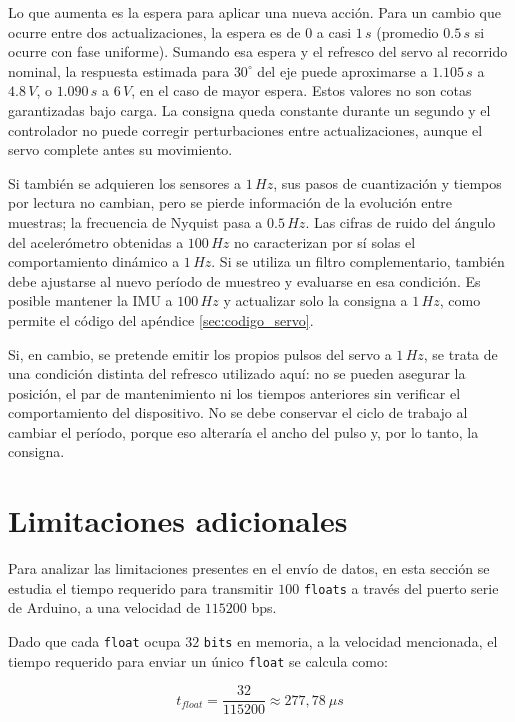 \documentclass[a4paper, twoside, 10pt, spanish]{article}
\numberwithin{table}{section}
\begin{document}
Lo que aumenta es la espera para aplicar una nueva acción. Para un cambio
que ocurre entre dos actualizaciones, la espera es de $0$ a casi $1\,s$
(promedio $0.5\,s$ si ocurre con fase uniforme). Sumando esa espera y el
refresco del servo al recorrido nominal, la respuesta estimada para
$30^\circ$ del eje puede aproximarse a $1.105\,s$ a $4.8\,V$, o
$1.090\,s$ a $6\,V$, en el caso de mayor espera. Estos valores no son
cotas garantizadas bajo carga. La consigna queda constante durante un
segundo y el controlador no puede corregir perturbaciones entre
actualizaciones, aunque el servo complete antes su movimiento.

Si también se adquieren los sensores a $1\,Hz$, sus pasos de cuantización
y tiempos por lectura no cambian, pero se pierde información de la
evolución entre muestras; la frecuencia de Nyquist pasa a $0.5\,Hz$.
Las cifras de ruido del ángulo del acelerómetro obtenidas a $100\,Hz$ no
caracterizan por sí solas el comportamiento dinámico a $1\,Hz$. Si se utiliza
un filtro complementario, también debe ajustarse al nuevo período de muestreo
y evaluarse en esa condición. Es posible mantener la IMU a $100\,Hz$ y actualizar
solo la consigna a $1\,Hz$, como permite el código del apéndice
\ref{sec:codigo_servo}.

Si, en cambio, se pretende emitir los propios pulsos del servo a $1\,Hz$,
se trata de una condición distinta del refresco utilizado aquí: no se
pueden asegurar la posición, el par de mantenimiento ni los tiempos
anteriores sin verificar el comportamiento del dispositivo. No se debe
conservar el ciclo de trabajo al cambiar el período, porque eso alteraría
el ancho del pulso y, por lo tanto, la consigna.

\section{Limitaciones adicionales}
Para analizar las limitaciones presentes en el envío de datos, en esta sección se estudia el tiempo requerido para transmitir $100$ \texttt{floats} a través del puerto serie de Arduino, a una velocidad de $115200$ bps.

Dado que cada \texttt{float} ocupa $32$ \texttt{bits} en memoria, a la velocidad mencionada, el tiempo requerido para enviar un único \texttt{float} se calcula como:

\begin{equation}
    t_{float} = \frac{32}{115200} \approx 277,78 \ \mu s
\end{equation}
\end{document}
